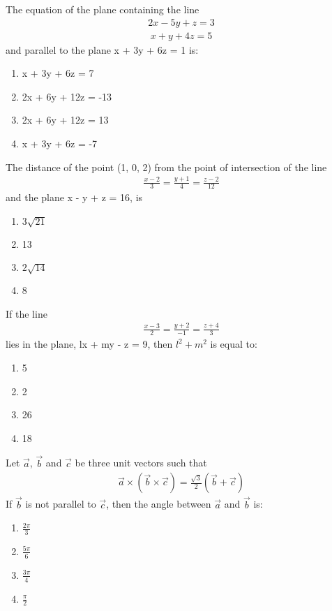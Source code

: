 \item The equation of the plane containing the line
\begin{align*}
2x - 5y + z = 3
\end{align*}
\begin{align*}
x + y + 4z = 5
\end{align*}
and parallel to the plane x + 3y + 6z = 1 is:
\begin{enumerate}
\item x + 3y + 6z = 7
\item 2x + 6y + 12z = -13
\item 2x + 6y + 12z = 13
\item x + 3y + 6z = -7
\end{enumerate}

\item The distance of the point (1, 0, 2) from the point of intersection of the line 
\begin{align*}
\frac{x-2}{3} = \frac{y+1}{4} = \frac{z-2}{12}
\end{align*}
and the plane x - y + z = 16, is
\begin{enumerate}
\item $3\sqrt{21}$
\item 13
\item $2\sqrt{14}$
\item 8
\end{enumerate}

\item If the line 
\begin{align*}
\frac{x-3}{2} = \frac{y+2}{-1} = \frac{z+4}{3}
\end{align*}
lies in the plane, lx + my - z = 9, then $l^2 + m^2$ is equal to:
\begin{enumerate}
\item 5
\item 2
\item 26
\item 18
\end{enumerate}

\item Let $\overrightarrow{a}$, $\overrightarrow{b}$ and $\overrightarrow{c}$ be three unit vectors such that
\begin{align*}
\overrightarrow{a} \times (\overrightarrow{b} \times \overrightarrow{c}) = \frac{\sqrt{3}}{2}(\overrightarrow{b} + \overrightarrow{c})
\end{align*}
If $\overrightarrow{b}$ is not parallel to $\overrightarrow{c}$, then the angle between $\overrightarrow{a}$ and $\overrightarrow{b}$ is:
\begin{enumerate}
\item $\frac{2\pi}{3}$
\item $\frac{5\pi}{6}$
\item $\frac{3\pi}{4}$
\item $\frac{\pi}{2}$
\end{enumerate}

